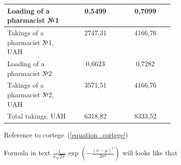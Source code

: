 \documentclass[11pt,twoside]{article}
\begin{document}
\begin{table}[h]
\begin{center}
\begin{tabular}{|p{0.4\linewidth}|c|c|}
                \hline
                Loading of a pharmacist №1 & 0,5499 & 0,7099\\
                \hline
                Takings of a pharmacist №1, UAH & 2747,31 & 4166,76\\
                \hline
                Loading of a pharmacist №2 & 0,6623 & 0,7282\\
                \hline
                Takings of a pharmacist №2, UAH & 3571,51 & 4166,76\\
                \hline
                Total takings, UAH & 6318,82 & 8333,52\\
                \hline
            \end{tabular}
        \end{center}
    \end{table}

    \noindent\makebox[\linewidth]{\rule{\paperwidth}{0.4pt}}

    Reference to cortege~(\ref{equation_cortege})


    Formula in text  $
    \label{eq:normal_dist}
    \frac{1}{\sigma\sqrt{2\pi}}
    \exp\left(-\frac{(x-\mu)^2}{2\sigma^2}\right)
    $ will looks like that

    \noindent\makebox[\linewidth]{\rule{\paperwidth}{0.4pt}}
\end{document}
